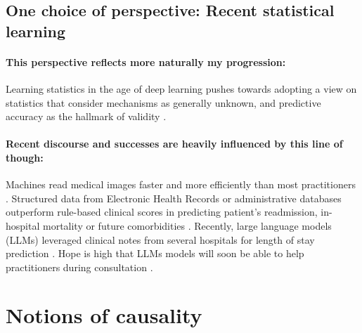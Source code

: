 \documentclass{report}
\begin{document}
\subsection{One choice of perspective: Recent statistical
  learning}\label{subsec:intro:recent_statistical_learning}
% 
\paragraph{This perspective reflects more naturally my progression:} Learning
statistics in the age of deep learning pushes towards adopting a view on
statistics that consider mechanisms as generally unknown, and predictive
accuracy as the hallmark of validity \citep{breiman2001statistical}.
% 
\paragraph{Recent discourse and successes are heavily influenced by this line of
  though:} Machines read medical images faster and more efficiently than most
practitioners \citep{zhou2021review}. Structured data from Electronic Health
Records \citep{rajkomar2018scalable} or administrative databases
\citep{beaulieu2021machine} outperform rule-based clinical scores in
predicting patient's readmission, in-hospital mortality or future
comorbidities \citep{li2020behrt}. Recently, large language models (LLMs)
leveraged clinical notes from several hospitals for length of stay prediction
\citep{jiang2023health}. Hope is high that LLMs models will soon be able to
help practitioners during consultation \citep{lee2023benefits}.


\section{Notions of causality}\label{sec:intro:causality}
\end{document}
